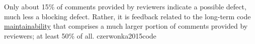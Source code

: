 \documentclass{article}
\begin{document}



  {Only about 15\% of comments provided by reviewers indicate a possible defect, much less a blocking defect. Rather, it is feedback related to the long-term code \ul{maintainability} that comprises a much larger portion of comments provided by reviewers; at least 50\% of all.}
  {czerwonka2015code}
\end{document}
